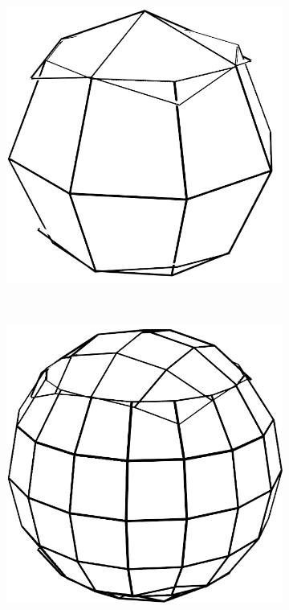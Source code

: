 \begin{figure}
    \centering
    \begin{subfigure}[b]{0.2\textwidth}
        \includegraphics[width=\textwidth]{figures/tessellation/tessellation_caps_proj1.png}
    \end{subfigure}
    ~ %
    \begin{subfigure}[b]{0.2\textwidth}
        \includegraphics[width=\textwidth]{figures/tessellation/tessellation_caps_proj2.png}

\end{subfigure}
\end{figure}
